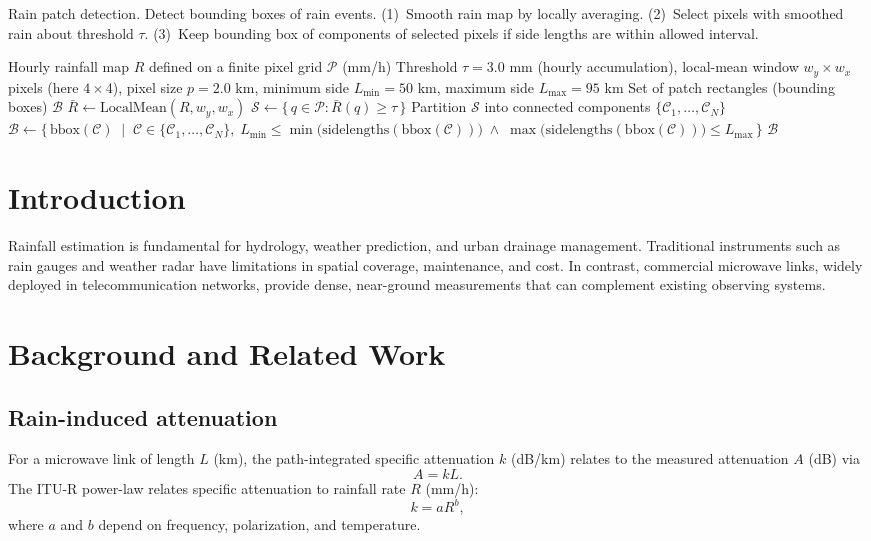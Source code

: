 \documentclass[11pt]{article}
\begin{document}
\begin{algorithm}
\caption{Rain patch detection. Detect bounding boxes of rain events. (1)~Smooth rain map by locally averaging. (2)~Select pixels with smoothed rain about threshold $\tau$. (3)~Keep bounding box of components of selected pixels if side lengths are within allowed interval. }
\label{alg:rainpatch}
\begin{algorithmic}[1]
\Require Hourly rainfall map $R$ defined on a finite pixel grid $\mathcal{P}$ (mm/h)
\Require Threshold $\tau=3.0$ mm (hourly accumulation), local-mean window $w_y\times w_x$ pixels (here $4\times4$), pixel size $p=2.0$ km, minimum side $L_{\min}=50$ km, maximum side $L_{\max}=95$ km
\Ensure Set of patch rectangles (bounding boxes) $\mathcal{B}$
\State $\bar{R} \gets \mathrm{LocalMean}(R, w_y, w_x)$ 
\State $\mathcal{S} \gets \{\,q\in\mathcal{P}: \bar{R}(q)\ge \tau\,\}$ 
\State Partition $\mathcal{S}$ into connected components $\{\mathcal{C}_1,\dots,\mathcal{C}_N\}$
\State $\mathcal{B} \gets \{\,\mathrm{bbox}(\mathcal{C})\;\mid\; \mathcal{C}\in\{\mathcal{C}_1,\dots,\mathcal{C}_N\},\; L_{\min} \le \min\big(\mathrm{sidelengths}(\mathrm{bbox}(\mathcal{C}))\big)\;\wedge\; \max\big(\mathrm{sidelengths}(\mathrm{bbox}(\mathcal{C}))\big) \le L_{\max}\,\}$ 
\State \Return $\mathcal{B}$
\end{algorithmic}
\end{algorithm}

\section{Introduction}
Rainfall estimation is fundamental for hydrology, weather prediction, and urban drainage management. Traditional instruments such as rain gauges and weather radar have limitations in spatial coverage, maintenance, and cost. In contrast, commercial microwave links, widely deployed in telecommunication networks, provide dense, near-ground measurements that can complement existing observing systems.

\section{Background and Related Work}
\subsection{Rain-induced attenuation}
For a microwave link of length $L$ (km), the path-integrated specific attenuation $k$ (dB/km) relates to the measured attenuation $A$ (dB) via
\begin{equation}
A = k L.
\end{equation}
The ITU-R power-law relates specific attenuation to rainfall rate $R$ (mm/h):
\begin{equation}
 k = a R^{b},
\end{equation}
where $a$ and $b$ depend on frequency, polarization, and temperature.
\end{document}
